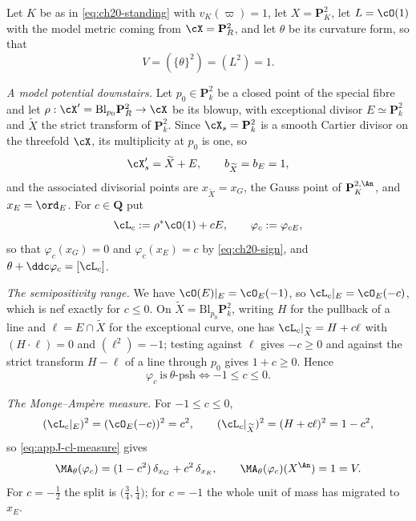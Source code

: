 \begin{example}
\label{ex:ch30-surface-blowup}
Let \(K\) be as in \eqref{eq:ch20-standing} with \(v_K(\varpi)=1\), let
\(X=\mathbf P^2_K\), let \(L=\cO(1)\) with the model metric coming from
\(\cX=\mathbf P^2_R\), and let \(\theta\) be its curvature form, so that
\[
                V=(\{\theta\}^2)=(L^2)=1 .
\]

\emph{A model potential downstairs.}  Let \(p_0\in\mathbf P^2_k\) be a
closed point of the special fibre and let
\(\rho:\cX'=\mathrm{Bl}_{p_0}\mathbf P^2_R\to\cX\) be its blowup, with
exceptional divisor \(E\simeq\mathbf P^2_k\) and \(\widetilde X\) the strict
transform of \(\mathbf P^2_k\).  Since \(\cX_s=\mathbf P^2_k\) is a smooth
Cartier divisor on the threefold \(\cX\), its multiplicity at \(p_0\) is
one, so
\[
                \cX'_s=\widetilde X+E,
                \qquad b_{\widetilde X}=b_E=1,
\]
and the associated divisorial points are \(x_{\widetilde X}=x_G\), the
Gauss point of \(\mathbf P^{2,\An}_K\), and \(x_E=\ord_E\).  For
\(c\in\mathbf Q\) put
\[
 \cL_c:=\rho^*\cO(1)+cE,
 \qquad
 \varphi_c:=\varphi_{cE},
\]
so that \(\varphi_c(x_G)=0\) and \(\varphi_c(x_E)=c\) by
\eqref{eq:ch20-sign}, and \(\theta+\ddc\varphi_c=[\cL_c]\).

\emph{The semipositivity range.}  We have \(\cO(E)|_E=\cO_E(-1)\), so
\(\cL_c|_E=\cO_E(-c)\), which is nef exactly for \(c\leq0\).  On
\(\widetilde X=\mathrm{Bl}_{p_0}\mathbf P^2_k\), writing \(H\) for the
pullback of a line and \(\ell=E\cap\widetilde X\) for the exceptional curve,
one has \(\cL_c|_{\widetilde X}=H+c\ell\) with \((H\cdot\ell)=0\) and
\((\ell^2)=-1\); testing against \(\ell\) gives \(-c\geq0\) and against the
strict transform \(H-\ell\) of a line through \(p_0\) gives \(1+c\geq0\).
Hence
\begin{equation}
\label{eq:ch30-surface-nef-range}
 \varphi_c\ \text{is}\ \theta\text{-psh}
 \iff -1\leq c\leq 0 .
\end{equation}

\emph{The Monge--Amp\`ere measure.}  For \(-1\leq c\leq0\),
\[
 (\cL_c|_E)^2=(\cO_E(-c))^2=c^2,
 \qquad
 (\cL_c|_{\widetilde X})^2=(H+c\ell)^2=1-c^2 ,
\]
so \eqref{eq:appJ-cl-measure} gives
\begin{equation}
\label{eq:ch30-surface-ma-down}
 \MA_\theta(\varphi_c)=(1-c^2)\,\delta_{x_G}+c^2\,\delta_{x_E},
 \qquad
 \MA_\theta(\varphi_c)(X^{\An})=1=V .
\end{equation}
For \(c=-\tfrac12\) the split is \(\bigl(\tfrac34,\tfrac14\bigr)\); for
\(c=-1\) the whole unit of mass has migrated to \(x_E\).


\end{example}
